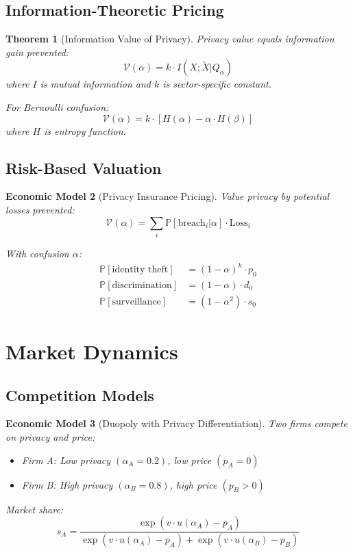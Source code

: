 \documentclass[11pt,final]{article}
\newcommand{\Value}{\mathcal{V}}
\newcommand{\latent}[1]{#1}
\newcommand{\observed}[1]{\tilde{#1}}
\newtheorem{theorem}{Theorem}[section]
\newtheorem{model}[theorem]{Economic Model}
\begin{document}
\subsection{Information-Theoretic Pricing}

\begin{theorem}[Information Value of Privacy]
Privacy value equals information gain prevented:
\begin{equation}
\Value(\alpha) = k \cdot I(\latent{X}; \observed{X}|Q_\alpha)
\end{equation}
where $I$ is mutual information and $k$ is sector-specific constant.

For Bernoulli confusion:
\begin{equation}
\Value(\alpha) = k \cdot [H(\alpha) - \alpha \cdot H(\beta)]
\end{equation}
where $H$ is entropy function.
\end{theorem}

\subsection{Risk-Based Valuation}

\begin{model}[Privacy Insurance Pricing]
Value privacy by potential losses prevented:
\begin{equation}
\Value(\alpha) = \sum_{i} \mathbb{P}[\text{breach}_i | \alpha] \cdot \text{Loss}_i
\end{equation}

With confusion $\alpha$:
\begin{align}
\mathbb{P}[\text{identity theft}] &= (1-\alpha)^k \cdot p_0 \\
\mathbb{P}[\text{discrimination}] &= (1-\alpha) \cdot d_0 \\
\mathbb{P}[\text{surveillance}] &= (1-\alpha^2) \cdot s_0
\end{align}
\end{model}

\section{Market Dynamics}

\subsection{Competition Models}

\begin{model}[Duopoly with Privacy Differentiation]
Two firms compete on privacy and price:
\begin{itemize}
    \item Firm A: Low privacy $(\alpha_A = 0.2)$, low price $(p_A = 0)$
    \item Firm B: High privacy $(\alpha_B = 0.8)$, high price $(p_B > 0)$
\end{itemize}

Market share:
\begin{equation}
s_A = \frac{\exp(v \cdot u(\alpha_A) - p_A)}{\exp(v \cdot u(\alpha_A) - p_A) + \exp(v \cdot u(\alpha_B) - p_B)}
\end{equation}
\end{model}
\end{document}
